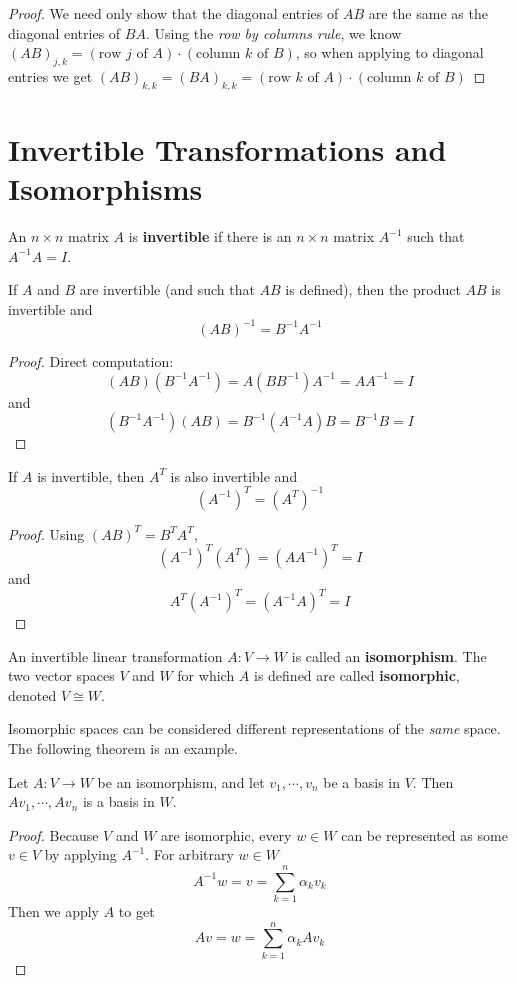 \begin{proof}
We need only show that the diagonal entries of $AB$ are the same as the diagonal entries of $BA$. Using the \textit{row by columns rule}, we know $(AB)_{j, k} = (\text{row $j$ of $A$}) \cdot (\text{column $k$ of $B$})$, so when applying to diagonal entries we get $(AB)_{k, k} = (BA)_{k, k} = (\text{row $k$ of $A$}) \cdot (\text{column $k$ of $B$})$
\end{proof}

\section{Invertible Transformations and Isomorphisms}
\begin{definition}
An $n \times n$ matrix $A$ is \textbf{invertible} if there is an $n \times n$ matrix $A^{-1}$ such that $A^{-1}A = I$. 
\end{definition}

\begin{theorem}
If $A$ and $B$ are invertible (and such that $AB$ is defined), then the product $AB$ is invertible and 
$$(AB)^{-1} = B^{-1} A^{-1}$$
\end{theorem}

\begin{proof}
Direct computation:
$$(AB)(B^{-1}A^{-1}) = A(BB^{-1})A^{-1} = AA^{-1} = I$$
and 
$$(B^{-1}A^{-1})(AB) = B^{-1}(A^{-1}A)B = B^{-1}B = I$$
\end{proof}

\begin{theorem}
If $A$ is invertible, then $A^{T}$ is also invertible and 
$$(A^{-1})^{T} = (A^{T})^{-1}$$
\end{theorem}

\begin{proof}
Using $(AB)^{T} = B^{T} A^{T}$, 
$$(A^{-1})^{T} (A^{T}) = (AA^{-1})^{T} = I$$
and 
$$A^{T}(A^{-1})^{T} = (A^{-1}A)^{T} = I$$
\end{proof}

\begin{definition}
An invertible linear transformation $A: V \rightarrow W$ is called an \textbf{isomorphism}. The two vector spaces $V$ and $W$ for which $A$ is defined are called \textbf{isomorphic}, denoted $V \cong W$. 
\end{definition}

Isomorphic spaces can be considered different representations of the \textit{same} space. The following theorem is an example. 
\begin{theorem}
Let $A : V \rightarrow W$ be an isomorphism, and let $v_{1}, \cdots, v_{n}$ be a basis in $V$. Then $Av_{1}, \cdots, Av_{n}$ is a basis in $W$. 
\end{theorem}

\begin{proof}
Because $V$ and $W$ are isomorphic, every $w \in W$ can be represented as some $v \in V$ by applying $A^{-1}$. For arbitrary $w \in W$
$$A^{-1}w = v = \sum_{k=1}^{n} \alpha_{k} v_{k}$$
Then we apply $A$ to get 
$$Av = w = \sum_{k=1}^{n} \alpha_{k} Av_{k}$$
\end{proof}

